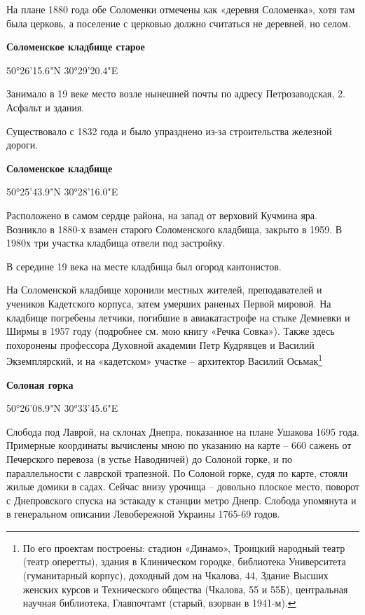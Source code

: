 На плане 1880 года обе Соломенки отмечены как «деревня Соломенка», хотя там была церковь, а поселение с церковью должно считаться не деревней, но селом.\\

\medskip

\textbf{Соломенское кладбище старое}

50°26'15.6"N 30°29'20.4"E

Занимало в 19 веке место возле нынешней почты по адресу Петрозаводская, 2. Асфальт и здания.

Существовало с 1832 года и было упразднено из-за строительства железной дороги.
\\

\medskip

\textbf{Соломенское кладбище}

50°25'43.9"N 30°28'16.0"E

Расположено в самом сердце района, на запад от верховий Кучмина яра. Возникло в 1880-х взамен старого Соломенского кладбища, закрыто в 1959. В 1980х три участка кладбища отвели под застройку.

В середине 19 века на месте кладбища был огород кантонистов.

На Соломенской кладбище хоронили местных жителей, преподавателей и учеников Кадетского корпуса, затем умерших раненых Первой мировой. На кладбище погребены летчики, погибшие в авиакатастрофе на стыке Демиевки и Ширмы в 1957 году (подробнее см. мою книгу «Речка Совка»). Также здесь похоронены профессора Духовной академии Петр Кудрявцев и Василий Экземплярский, и на «кадетском» участке – архитектор Василий Осьмак\footnote{По его проектам построены: стадион «Динамо», Троицкий народный театр (театр оперетты), здания в Клиническом городке, библиотека Университета (гуманитарный корпус), доходный дом на Чкалова, 44, Здание Высших женских курсов и Технического общества (Чкалова, 55 и 55Б), центральная научная библиотека, Главпочтамт (старый, взорван в 1941-м).}\\

\medskip

\textbf{Солоная горка} 

50°26'08.9"N 30°33'45.6"E

Слобода под Лаврой, на склонах Днепра, показанное на плане Ушакова 1695 года. Примерные координаты вычислены мною по указанию на карте – 660 сажень от Печерского перевоза (в устье Наводничей) до Солоной горке, и по параллельности с лаврской трапезной. По Солоной горке, судя по карте, стояли жилые домики в садах. Сейчас внизу урочища – довольно плоское место, поворот с Днепровского спуска на эстакаду к станции метро Днепр. Слобода упомянута и в генеральном описании Левобережной Украины 1765-69 годов.\\

